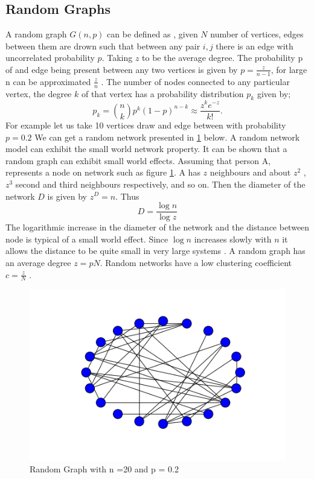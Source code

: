  \subsection{Random Graphs} 
 A random graph $G(n,p)$ can be defined as , given  $N$ number of vertices, edges between them are drown such that between any pair $i,j$ there is an edge with uncorrelated probability $p$. Taking $z$ to be the average degree. The probability p of and edge being present between any two vertices is given by $p = \frac{z}{n-1}$, for large n can be approximated  $\frac{z}{n}$  \citep{newman2002random}. The number of nodes connected to any particular vertex, the degree $k$ of that vertex has a probability distribution $p_k$ given by;
 \begin{equation}
 p_k = \binom{n}{k} p^k (1-p)^{n-k} \approx \frac{z^k e^{-z}}{k!}.
 \end{equation}
   For example let us take 10 vertices draw and edge between with probability $p = 0.2$ We can get a random network presented in \ref{fig:3.1} below. A random network model can exhibit the small world network property. 
   It can be shown that a random graph can exhibit small world effects. Assuming that person A, represents a node on network such as  figure \ref{fig:3.1}. A has $z$ neighbours and  about $z^2$ , $z^3$  second and third neighbours respectively, and so on. Then the diameter of the network $D$ is given by $z^D = n$. Thus
   \begin{equation*}
   D = \frac{\log n}{\log z}
   \end{equation*}
    The logarithmic increase in the diameter of the network and the distance between node is typical of a small world effect. Since $\log n$ increases slowly with $n$ it allows the distance to be quite small in very large systems \citep{newman2000models}.
    A random graph  has an average degree $z= pN$. Random networks have a low clustering coefficient $ c = \frac{z}{N}$ \citep{newman2003structure}.
   \begin{figure}[h!]
   \caption{Random Graph with n =20 and p = 0.2}
   \label{fig:3.1}
   \centering
   \includegraphics[scale=0.5]{images/randomgraph.png} 
   \end{figure}
   
